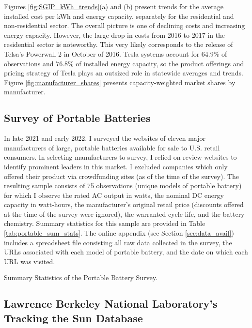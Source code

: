 \documentclass[preprint,12pt,authoryear]{elsarticle}
\begin{document}
Figures \ref{fig:SGIP_kWh_trends}(a) and (b) present trends for the average installed cost per kWh and energy capacity, separately for the residential and non-residential sector. The overall picture is one of declining costs and increasing energy capacity. However, the large drop in costs from 2016 to 2017 in the residential sector is noteworthy. This very likely corresponds to the release of Telsa's Powerwall 2 in October of 2016. Tesla systems account for 64.9\% of observations and 76.8\% of installed energy capacity, so the product offerings and pricing strategy of Tesla plays an outsized role in statewide averages and trends. Figure \ref{fig:manufacturer_shares} presents capacity-weighted market shares by manufacturer.

\subsection{Survey of Portable Batteries}\label{sec:data_portable}

In late 2021 and early 2022, I surveyed the websites of eleven major manufacturers of large, portable batteries available for sale to U.S. retail consumers. In selecting manufacturers to survey, I relied on review websites to identify prominent leaders in this market. I excluded companies which only offered their product via crowdfunding sites (as of the time of the survey). The resulting sample consists of 75 observations (unique models of portable battery) for which I observe the rated AC output in watts, the nominal DC energy capacity in watt-hours, the manufacturer's original retail price (discounts offered at the time of the survey were ignored), the warranted cycle life, and the battery chemistry. Summary statistics for this sample are provided in Table \ref{tab:portable_sum_stats}. The online appendix (see Section \ref{sec:data_avail}) includes a spreadsheet file consisting all raw data collected in the survey, the URLs associated with each model of portable battery, and the date on which each URL was visited.

\begin{table}[h]
\centering

\caption{Summary Statistics of the Portable Battery Survey.}\label{tab:portable_sum_stats}
\end{table}

\subsection{Lawrence Berkeley National Laboratory's Tracking the Sun Database}\label{sec:data_TTS}
\end{document}
